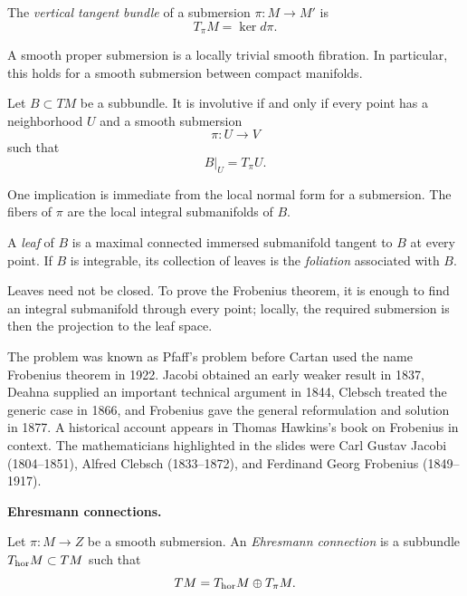 \begin{definition}
\label{definition-vertical-tangent}
The {\it vertical tangent bundle} of a
submersion $\pi:M\longrightarrow M'$ is
$$
T_\pi M=\ker d\pi.
$$
\end{definition}

\begin{theorem}[Ehresmann]
\label{theorem-ehresmann-fibration}
A smooth proper submersion is a locally
trivial smooth fibration. In particular,
this holds for a smooth submersion between
compact manifolds.
\end{theorem}

\begin{theorem}[Frobenius]
\label{theorem-frobenius}
Let $B\subset TM$ be a subbundle. It is
involutive if and only if every point has a
neighborhood $U$ and a smooth submersion
$$
\pi:U\longrightarrow V
$$
such that
$$
B|_U=T_\pi U.
$$
\end{theorem}

One implication is immediate from the local
normal form for a submersion. The fibers of
$\pi$ are the local integral submanifolds of
$B$.

\begin{definition}
\label{definition-leaf-foliation}
A {\it leaf} of $B$ is a maximal connected
immersed submanifold tangent to $B$ at every
point. If $B$ is integrable, its collection
of leaves is the {\it foliation} associated
with $B$.
\end{definition}

Leaves need not be closed. To prove the
Frobenius theorem, it is enough to find an
integral submanifold through every point;
locally, the required submersion is then the
projection to the leaf space.

The problem was known as Pfaff's problem
before Cartan used the name Frobenius theorem
in 1922. Jacobi obtained an early weaker
result in 1837, Deahna supplied an important
technical argument in 1844, Clebsch treated
the generic case in 1866, and Frobenius gave
the general reformulation and solution in
1877. A historical account appears in
Thomas Hawkins's book on Frobenius in
context. The mathematicians highlighted in
the slides were Carl Gustav Jacobi
(1804--1851), Alfred Clebsch (1833--1872),
and Ferdinand Georg Frobenius (1849--1917).

\medskip\noindent
{\bf Ehresmann connections.}

\begin{definition}
\label{definition-ehresmann-connection}
Let $\pi:M\longrightarrow Z$ be a smooth
submersion. An {\it Ehresmann connection}
is a subbundle $T_{\rm hor}M\subset TM$
such that
$$
TM=T_{\rm hor}M\oplus T_\pi M.
$$
\end{definition}


